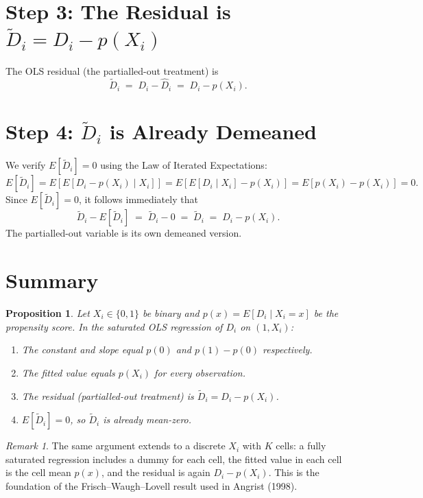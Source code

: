 \documentclass[11pt]{article}
\newtheorem{proposition}{Proposition}
\theoremstyle{remark}
\newtheorem{remark}{Remark}
\begin{document}
\section{Step 3: The Residual is $\tilde{D}_i = D_i - p(X_i)$}

The OLS residual (the partialled-out treatment) is
\[
  \tilde{D}_i \;=\; D_i - \hat{D}_i \;=\; D_i - p(X_i).
\]

\section{Step 4: $\tilde{D}_i$ is Already Demeaned}

We verify $E[\tilde{D}_i] = 0$ using the Law of Iterated Expectations:
\[
  E[\tilde{D}_i]
  = E\!\left[E[D_i - p(X_i) \mid X_i]\right]
  = E\!\left[E[D_i \mid X_i] - p(X_i)\right]
  = E\!\left[p(X_i) - p(X_i)\right]
  = 0.
\]
Since $E[\tilde{D}_i] = 0$, it follows immediately that
\[
  \tilde{D}_i - E[\tilde{D}_i] \;=\; \tilde{D}_i - 0 \;=\; \tilde{D}_i \;=\; D_i - p(X_i).
\]
The partialled-out variable is its own demeaned version.

\section{Summary}

\begin{proposition}
Let $X_i \in \{0,1\}$ be binary and $p(x) = E[D_i \mid X_i = x]$ be the
propensity score.  In the saturated OLS regression of $D_i$ on $(1, X_i)$:
\begin{enumerate}
  \item The constant and slope equal $p(0)$ and $p(1)-p(0)$ respectively.
  \item The fitted value equals $p(X_i)$ for every observation.
  \item The residual (partialled-out treatment) is $\tilde{D}_i = D_i - p(X_i)$.
  \item $E[\tilde{D}_i] = 0$, so $\tilde{D}_i$ is already mean-zero.
\end{enumerate}
\end{proposition}

\begin{remark}
The same argument extends to a discrete $X_i$ with $K$ cells: a fully saturated
regression includes a dummy for each cell, the fitted value in each cell is the
cell mean $p(x)$, and the residual is again $D_i - p(X_i)$.  This is the
foundation of the Frisch--Waugh--Lovell result used in Angrist (1998).
\end{remark}
\end{document}
